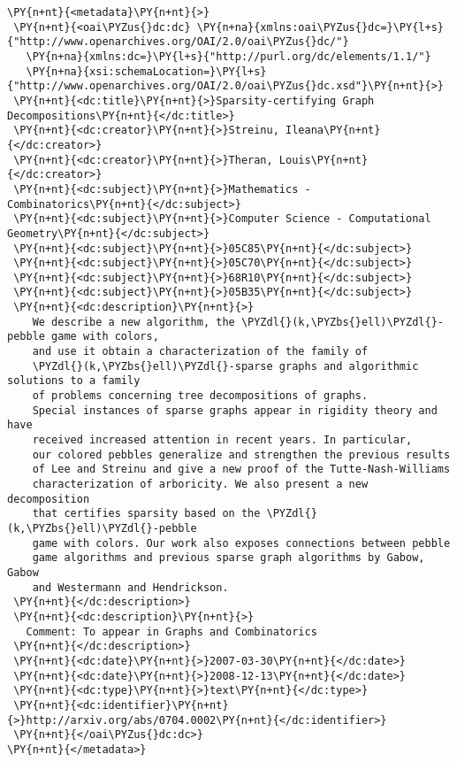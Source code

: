 \begin{Verbatim}[commandchars=\\\{\}, fontsize=\footnotesize, frame=single]
\PY{n+nt}{<metadata}\PY{n+nt}{>}
 \PY{n+nt}{<oai\PYZus{}dc:dc} \PY{n+na}{xmlns:oai\PYZus{}dc=}\PY{l+s}{"http://www.openarchives.org/OAI/2.0/oai\PYZus{}dc/"} 
   \PY{n+na}{xmlns:dc=}\PY{l+s}{"http://purl.org/dc/elements/1.1/"} 
   \PY{n+na}{xsi:schemaLocation=}\PY{l+s}{"http://www.openarchives.org/OAI/2.0/oai\PYZus{}dc.xsd"}\PY{n+nt}{>}
 \PY{n+nt}{<dc:title}\PY{n+nt}{>}Sparsity-certifying Graph Decompositions\PY{n+nt}{</dc:title>}
 \PY{n+nt}{<dc:creator}\PY{n+nt}{>}Streinu, Ileana\PY{n+nt}{</dc:creator>}
 \PY{n+nt}{<dc:creator}\PY{n+nt}{>}Theran, Louis\PY{n+nt}{</dc:creator>}
 \PY{n+nt}{<dc:subject}\PY{n+nt}{>}Mathematics - Combinatorics\PY{n+nt}{</dc:subject>}
 \PY{n+nt}{<dc:subject}\PY{n+nt}{>}Computer Science - Computational Geometry\PY{n+nt}{</dc:subject>}
 \PY{n+nt}{<dc:subject}\PY{n+nt}{>}05C85\PY{n+nt}{</dc:subject>}
 \PY{n+nt}{<dc:subject}\PY{n+nt}{>}05C70\PY{n+nt}{</dc:subject>}
 \PY{n+nt}{<dc:subject}\PY{n+nt}{>}68R10\PY{n+nt}{</dc:subject>}
 \PY{n+nt}{<dc:subject}\PY{n+nt}{>}05B35\PY{n+nt}{</dc:subject>}
 \PY{n+nt}{<dc:description}\PY{n+nt}{>}  
    We describe a new algorithm, the \PYZdl{}(k,\PYZbs{}ell)\PYZdl{}-pebble game with colors, 
    and use it obtain a characterization of the family of 
    \PYZdl{}(k,\PYZbs{}ell)\PYZdl{}-sparse graphs and algorithmic solutions to a family
    of problems concerning tree decompositions of graphs. 
    Special instances of sparse graphs appear in rigidity theory and have 
    received increased attention in recent years. In particular, 
    our colored pebbles generalize and strengthen the previous results 
    of Lee and Streinu and give a new proof of the Tutte-Nash-Williams 
    characterization of arboricity. We also present a new decomposition 
    that certifies sparsity based on the \PYZdl{}(k,\PYZbs{}ell)\PYZdl{}-pebble 
    game with colors. Our work also exposes connections between pebble
    game algorithms and previous sparse graph algorithms by Gabow, Gabow
    and Westermann and Hendrickson.
 \PY{n+nt}{</dc:description>}
 \PY{n+nt}{<dc:description}\PY{n+nt}{>}
   Comment: To appear in Graphs and Combinatorics
 \PY{n+nt}{</dc:description>}
 \PY{n+nt}{<dc:date}\PY{n+nt}{>}2007-03-30\PY{n+nt}{</dc:date>}
 \PY{n+nt}{<dc:date}\PY{n+nt}{>}2008-12-13\PY{n+nt}{</dc:date>}
 \PY{n+nt}{<dc:type}\PY{n+nt}{>}text\PY{n+nt}{</dc:type>}
 \PY{n+nt}{<dc:identifier}\PY{n+nt}{>}http://arxiv.org/abs/0704.0002\PY{n+nt}{</dc:identifier>}
 \PY{n+nt}{</oai\PYZus{}dc:dc>}
\PY{n+nt}{</metadata>}
\end{Verbatim}
